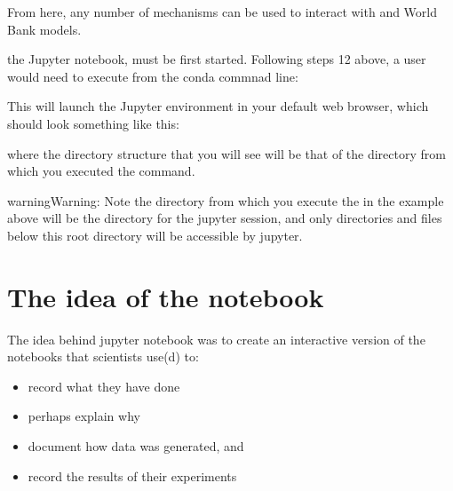 \documentclass[letterpaper,10pt,english]{jupyterBook}
\begin{document}
\sphinxAtStartPar
{}

\sphinxAtStartPar
From here, any number of mechanisms can be used to interact with  and World Bank models.

\sphinxAtStartPar
{} the Jupyter notebook, must be first started.  Following steps 1\sphinxhyphen{}2 above, a user would need to execute from the conda commnad line:

\sphinxAtStartPar
{}

\sphinxAtStartPar
This will launch the Jupyter environment in your default web browser, which should look something like this:

\sphinxAtStartPar
{}

\sphinxAtStartPar
where the directory structure that you will see will be that of the directory from which you executed the  command.

\begin{sphinxadmonition}{warning}{Warning:}
\sphinxAtStartPar
Note the directory from which you execute the   in the example above will be the  directory for the jupyter session, and only directories and files below this root directory will be accessible by jupyter.
\end{sphinxadmonition}


\section{The idea of the notebook}
\label{\detokenize{content/04_PythonEssentials/Intro_Jupyter_notebook:the-idea-of-the-notebook}}
\sphinxAtStartPar
The idea behind jupyter notebook was to create an interactive version of the notebooks that scientists use(d) to:
\begin{itemize}
\item {} 
\sphinxAtStartPar
record what they have done

\item {} 
\sphinxAtStartPar
perhaps explain why

\item {} 
\sphinxAtStartPar
document how data was generated, and

\item {} 
\sphinxAtStartPar
record the results of their experiments

\end{itemize}
\end{document}
